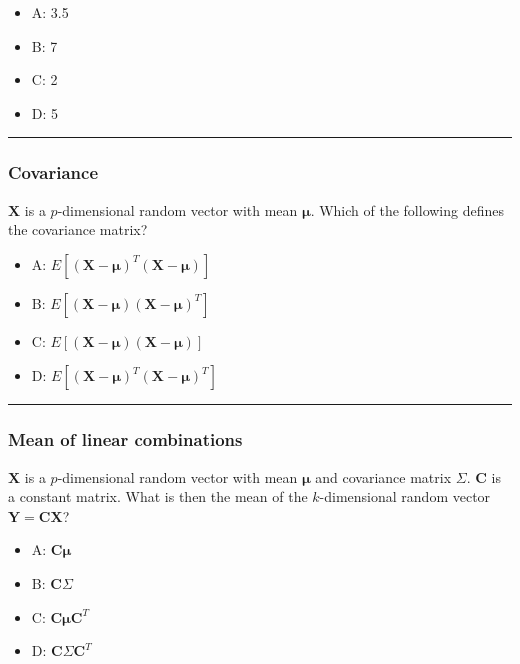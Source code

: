 \documentclass[]{article}
\providecommand{\tightlist}{%
  \setlength{\itemsep}{0pt}\setlength{\parskip}{0pt}}
\begin{document}
\begin{itemize}
\tightlist
\item
  A: 3.5
\item
  B: 7
\item
  C: 2
\item
  D: 5
\end{itemize}

\begin{center}\rule{0.5\linewidth}{\linethickness}\end{center}

\hypertarget{covariance}{%
\subsubsection{Covariance}\label{covariance}}

\(\mathbf{X}\) is a \(p\)-dimensional random vector with mean
\(\mathbf{\mu}\). Which of the following defines the covariance matrix?

\begin{itemize}
\tightlist
\item
  A: \(E[(\mathbf{X}-\mathbf{\mu})^T(\mathbf{X}-\mathbf{\mu})]\)
\item
  B: \(E[(\mathbf{X}-\mathbf{\mu})(\mathbf{X}-\mathbf{\mu})^T]\)
\item
  C: \(E[(\mathbf{X}-\mathbf{\mu})(\mathbf{X}-\mathbf{\mu})]\)\\
\item
  D: \(E[(\mathbf{X}-\mathbf{\mu})^T(\mathbf{X}-\mathbf{\mu})^T]\)
\end{itemize}

\begin{center}\rule{0.5\linewidth}{\linethickness}\end{center}

\hypertarget{mean-of-linear-combinations}{%
\subsubsection{Mean of linear
combinations}\label{mean-of-linear-combinations}}

\(\mathbf{X}\) is a \(p\)-dimensional random vector with mean
\(\mathbf{\mu}\) and covariance matrix \(\Sigma\). \(\mathbf{C}\) is a
constant matrix. What is then the mean of the \(k\)-dimensional random
vector \(\mathbf{Y}=\mathbf{C}\mathbf{X}\)?

\begin{itemize}
\tightlist
\item
  A: \(\mathbf{C}\mathbf{\mu}\)
\item
  B: \(\mathbf{C}\Sigma\)
\item
  C: \(\mathbf{C}\mathbf{\mu}\mathbf{C}^T\)
\item
  D: \(\mathbf{C}\Sigma\mathbf{C}^T\)
\end{itemize}
\end{document}
